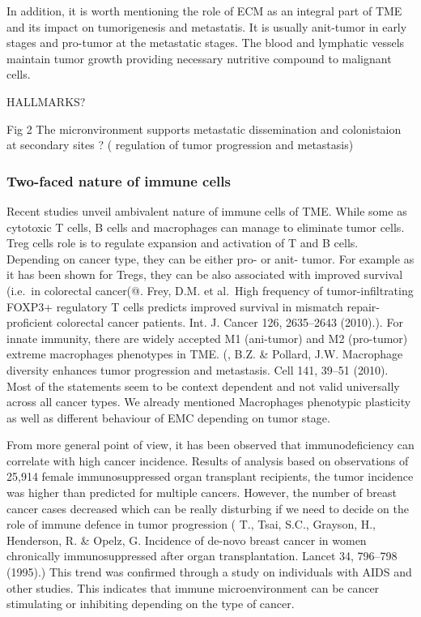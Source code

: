 \documentclass[12pt,]{book}
\theoremstyle{definition}
\theoremstyle{definition}
\theoremstyle{definition}
\theoremstyle{remark}
\begin{document}
In addition, it is worth mentioning the role of ECM as an integral part
of TME and its impact on tumorigenesis and metastatis. It is usually
anit-tumor in early stages and pro-tumor at the metastatic stages. The
blood and lymphatic vessels maintain tumor growth providing necessary
nutritive compound to malignant cells.

HALLMARKS?

Fig 2 The micronvironment supports metastatic dissemination and
colonistaion at secondary sites ? (\citet{Microenvironmental} regulation
of tumor progression and metastasis)

\hypertarget{two-faced-nature-of-immune-cells}{%
\subsubsection{Two-faced nature of immune
cells}\label{two-faced-nature-of-immune-cells}}

Recent studies unveil ambivalent nature of immune cells of TME. While
some as cytotoxic T cells, B cells and macrophages can manage to
eliminate tumor cells. Treg cells role is to regulate expansion and
activation of T and B cells. Depending on cancer type, they can be
either pro- or anit- tumor. For example as it has been shown for Tregs,
they can be also associated with improved survival (i.e.~in colorectal
cancer(@. Frey, D.M. et al.~High frequency of tumor-infiltrating FOXP3+
regulatory T cells predicts improved survival in mismatch
repair-proficient colorectal cancer patients. Int. J. Cancer 126,
2635--2643 (2010).). For innate immunity, there are widely accepted M1
(ani-tumor) and M2 (pro-tumor) extreme macrophages phenotypes in TME.
(\citet{Qian}, B.Z. \& Pollard, J.W. Macrophage diversity enhances tumor
progression and metastasis. Cell 141, 39--51 (2010). Most of the
statements seem to be context dependent and not valid universally across
all cancer types. We already mentioned Macrophages phenotypic plasticity
as well as different behaviour of EMC depending on tumor stage.

From more general point of view, it has been observed that
immunodeficiency can correlate with high cancer incidence. Results of
analysis based on observations of 25,914 female immunosuppressed organ
transplant recipients, the tumor incidence was higher than predicted for
multiple cancers. However, the number of breast cancer cases decreased
which can be really disturbing if we need to decide on the role of
immune defence in tumor progression (\citet{Stewart} T., Tsai, S.C.,
Grayson, H., Henderson, R. \& Opelz, G. Incidence of de-novo breast
cancer in women chronically immunosuppressed after organ
transplantation. Lancet 34, 796--798 (1995).) This trend was confirmed
through a study on individuals with AIDS and other studies. This
indicates that immune microenvironment can be cancer stimulating or
inhibiting depending on the type of cancer.
\end{document}
